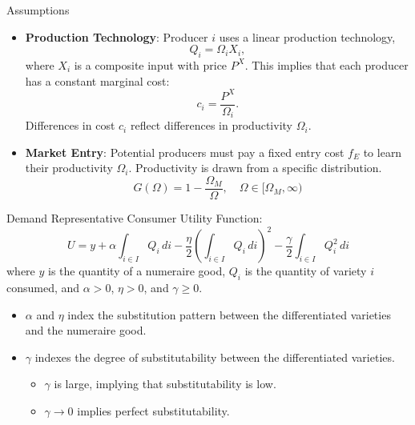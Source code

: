 \documentclass[aspectratio=169]{beamer}  %
\begin{document}
\begin{frame}{Assumptions}
    \begin{itemize}
        \item \textbf{Production Technology}: Producer \(i\) uses a linear production technology, 
        \[
            Q_i = \Omega_i X_i,
        \]
        where \(X_i\) is a composite input with price \(P^X\). This implies that each producer has a constant marginal cost:
    \[
        c_i = \frac{P^X}{\Omega_i}.
    \]
    Differences in cost \(c_i\) reflect differences in productivity \(\Omega_i\).
        \item   \textbf{Market Entry}: Potential producers must pay a fixed entry cost \( f_E \) to learn their productivity \( \Omega_i \). Productivity is drawn from a specific distribution.
        \[
            G(\Omega) = 1 - \frac{\Omega_M}{\Omega}, \quad \Omega \in [\Omega_M, \infty)
        \]
    \end{itemize}
\end{frame}

\begin{frame}{Demand}
    Representative Consumer Utility Function:
    \[
    U = y + \alpha \int_{i \in I} Q_i \, di - \frac{\eta}{2} \left( \int_{i \in I} Q_i \, di \right)^2 - \frac{\gamma}{2} \int_{i \in I} Q_i^2 \, di
    \]
    where \(y\) is the quantity of a numeraire good, \(Q_i\) is the quantity of variety \(i\) consumed, and \(\alpha > 0\), \(\eta > 0\), and \(\gamma \geq 0\).
    \begin{itemize}
        \item \(\alpha\) and \(\eta\) index the substitution pattern between the differentiated varieties and the numeraire good.
        \item \(\gamma\) indexes the degree of substitutability between the differentiated varieties.
        \begin{itemize}
            \item \(\gamma\) is large, implying that substitutability is low.
            \item \(\gamma \to 0\) implies perfect substitutability.
        \end{itemize}
    \end{itemize}
\end{frame}
\end{document}
